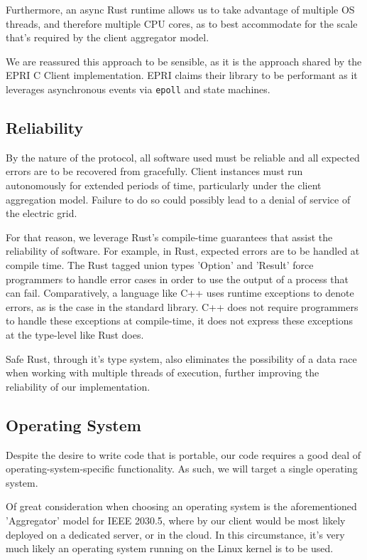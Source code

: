 Furthermore, an async Rust runtime allows us to take advantage of multiple OS threads, and therefore multiple CPU cores, as to best accommodate for the scale that's required by the client aggregator model.

We are reassured this approach to be sensible, as it is the approach shared by the EPRI C Client implementation. EPRI claims their library to be performant as it leverages asynchronous events via \texttt{epoll} and state machines.


\subsection{Reliability}
By the nature of the protocol, all software used must be reliable and all expected errors are to be recovered from gracefully. Client instances must run autonomously for extended periods of time, particularly under the client aggregation model. Failure to do so could possibly lead to a denial of service of the electric grid.

For that reason, we leverage Rust's compile-time guarantees that assist the reliability of software. For example, in Rust, expected errors are to be handled at compile time. The Rust tagged union types 'Option' and 'Result' force programmers to handle error cases in order to use the output of a process that can fail. Comparatively, a language like C++ uses runtime exceptions to denote errors, as is the case in the standard library. C++ does not require programmers to handle these exceptions at compile-time, it does not express these exceptions at the type-level like Rust does.

Safe Rust, through it's type system, also eliminates the possibility of a data race when working with multiple threads of execution, further improving the reliability of our implementation.

\subsection{Operating System}
Despite the desire to write code that is portable, our code requires a good deal of operating-system-specific functionality. As such, we will target a single operating system. 

Of great consideration when choosing an operating system is the aforementioned 'Aggregator' model for IEEE 2030.5, where by our client would be most likely deployed on a dedicated server, or in the cloud. In this circumstance, it's very much likely an operating system running on the Linux kernel is to be used.

